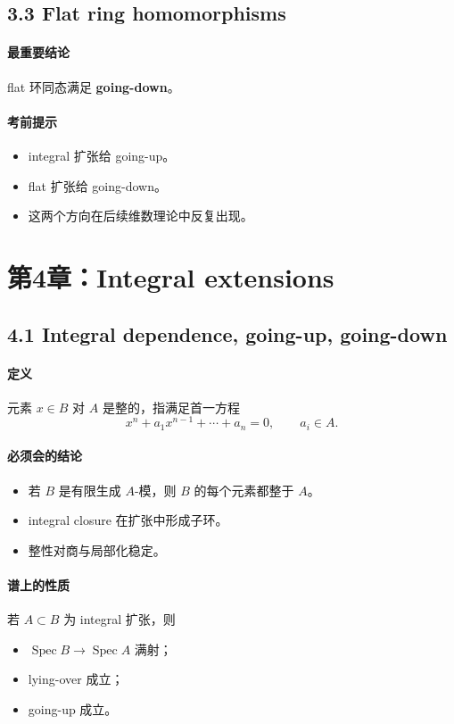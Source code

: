 \documentclass[a4paper]{ctexart}
\begin{document}
\subsection{3.3 Flat ring homomorphisms}

\paragraph{最重要结论}
flat 环同态满足 \textbf{going-down}。

\paragraph{考前提示}
\begin{itemize}
  \item integral 扩张给 going-up。
  \item flat 扩张给 going-down。
  \item 这两个方向在后续维数理论中反复出现。
\end{itemize}

\section{第4章：Integral extensions}

\subsection{4.1 Integral dependence, going-up, going-down}

\paragraph{定义}
元素 \(x\in B\) 对 \(A\) 是整的，指满足首一方程
\[
x^n+a_1x^{n-1}+\cdots+a_n=0,\qquad a_i\in A.
\]

\paragraph{必须会的结论}
\begin{itemize}
  \item 若 \(B\) 是有限生成 \(A\)-模，则 \(B\) 的每个元素都整于 \(A\)。
  \item integral closure 在扩张中形成子环。
  \item 整性对商与局部化稳定。
\end{itemize}

\paragraph{谱上的性质}
若 \(A\subset B\) 为 integral 扩张，则
\begin{itemize}
  \item \(\operatorname{Spec}B\to \operatorname{Spec}A\) 满射；
  \item lying-over 成立；
  \item going-up 成立。
\end{itemize}
\end{document}
